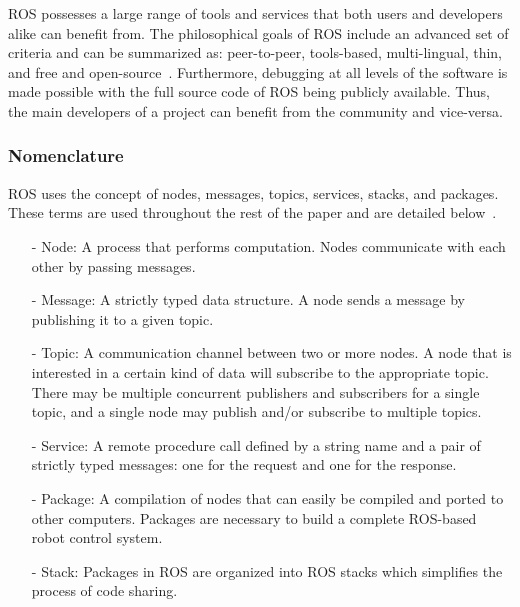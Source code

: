 ROS possesses a large range of tools and services that both users and developers alike can benefit from. The philosophical goals of ROS include an advanced set of criteria and can be summarized as: peer-to-peer, tools-based, multi-lingual, thin, and free and open-source~\cite{QUIGLEY.ICRA.2009}. Furthermore, debugging at all levels of the software is made possible with the full source code of ROS being publicly available. Thus, the main developers of a project can benefit from the community and vice-versa.

\subsubsection*{Nomenclature}
ROS uses the concept of nodes, messages, topics, services, stacks, and packages. These terms are used throughout the rest of the paper and are detailed below~\cite{QUIGLEY.ICRA.2009}.
\begin{itemize}
\item[-] Node: A process that performs computation. Nodes communicate with each other by passing messages.
\item[-] Message: A strictly typed data structure. A node sends a message by publishing it to a given topic.
\item[-] Topic: A communication channel between two or more
nodes. A node that is interested in a certain kind of data will subscribe
to the appropriate topic. There may be multiple concurrent
publishers and subscribers for a single topic, and a single
node may publish and/or subscribe to multiple topics.
\item[-] Service: A remote procedure call defined by a string name and a pair
of strictly typed messages: one for the request and one for
the response.
\item[-] Package: A compilation of nodes that can easily be compiled and ported to other computers. Packages are necessary to build a complete ROS-based robot control system.
\item[-] Stack: Packages in ROS are organized into ROS stacks which simplifies the process of code sharing. 

\end{itemize} 